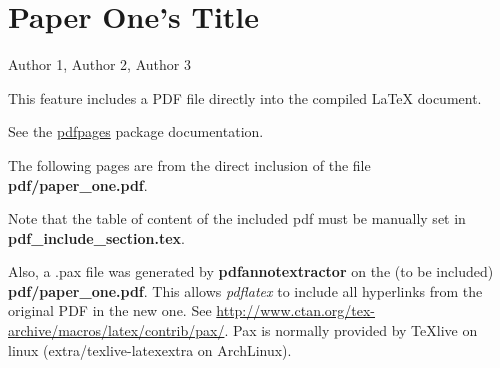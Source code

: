 
\newcommand{\PaperTitleOne}{Paper One's Title}

\section{\PaperTitleOne}

\begin{flushright}
Author 1, Author 2, Author 3
\end{flushright}

This feature includes a PDF file directly into the compiled LaTeX document.

See the \href{http://www.ctan.org/tex-archive/macros/latex/contrib/pdfpages/}{pdfpages}
package documentation.

The following pages are from the direct inclusion of the file
\textbf{pdf/paper\_one.pdf}.

Note that the table of content of the included pdf must be manually set in \break
\textbf{pdf\_include\_section.tex}.

Also, a .pax file was generated by \textbf{pdfannotextractor} on the (to be
included) \textbf{pdf/paper\_one.pdf}. This allows \textit{pdflatex} to include
all hyperlinks from the original PDF in the new one.
See \url{http://www.ctan.org/tex-archive/macros/latex/contrib/pax/}. Pax is
normally provided by TeXlive on linux (extra/texlive-latexextra on ArchLinux).


